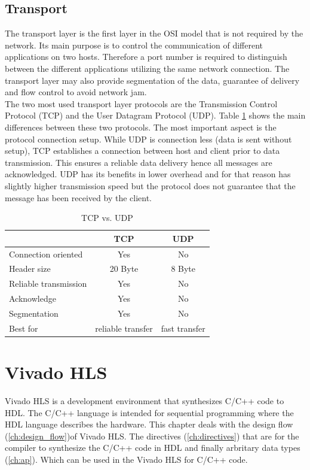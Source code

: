 \subsection{Transport} 
The transport layer is the first layer in the OSI model that is not required by
the network. Its main purpose is to control the communication of different
applications on two hosts. Therefore a port number is required to distinguish
between the different applications utilizing the same network connection. The
transport layer may also provide segmentation of the data, guarantee of delivery and flow control to avoid network jam.
\\

The two most used transport layer protocols are the Transmission Control
Protocol (TCP) and the User Datagram Protocol (UDP). Table \ref{tab:tcpudp}
shows the main differences between these two protocols. The most important
aspect is the protocol connection setup. While UDP is connection less (data is
sent without setup), TCP establishes a connection between host and client
prior to data transmission. This ensures a reliable data delivery hence all
messages are acknowledged. UDP has its benefits in lower overhead and for that
reason has slightly higher transmission speed but the protocol does not
guarantee that the message has been received by the client.

\begin{table}[h]
    \centering
    \begin{tabular}{ l  c  c }
        \toprule
         & \textbf{TCP} & \textbf{UDP} \\
        \midrule
        Connection oriented & Yes & No \\
        Header size & 20 Byte & 8 Byte \\
        Reliable transmission & Yes & No \\
        Acknowledge & Yes & No \\
        Segmentation & Yes & No \\
        Best for & reliable transfer & fast transfer  \\
        \bottomrule
    \end{tabular}
    \caption{TCP vs. UDP}
    \label{tab:tcpudp}
\end{table}

\section{Vivado HLS} \label{ch:th:hls}
Vivado HLS is a development environment that synthesizes C/C++ code to HDL. The
C/C++ language is intended for sequential programming where the HDL language describes the hardware. This chapter deals with the design flow (\ref{ch:design_flow})of Vivado HLS. The directives (\ref{ch:directives}) that are for the compiler to synthesize the C/C++ code in HDL and finally arbritary data types (\ref{ch:ap}). Which can be used in the Vivado HLS for C/C++ code.


